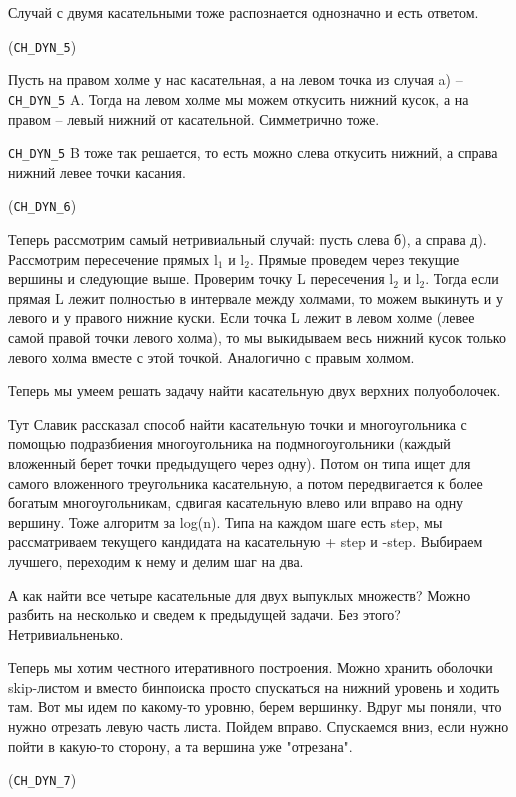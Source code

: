 \documentclass[11pt]{article}
\begin{document}
Случай с двумя касательными тоже распознается однозначно и есть
ответом.

(\verb~CH_DYN_5~)

Пусть на правом холме у нас касательная, а на левом точка из случая
a) -- \verb~CH_DYN_5~ A. Тогда на левом холме мы можем откусить нижний
кусок, а на правом -- левый нижний от касательной. Симметрично тоже.

\verb~CH_DYN_5~ B тоже так решается, то есть можно слева откусить нижний, а
справа нижний левее точки касания.

(\verb~CH_DYN_6~)

Теперь рассмотрим самый нетривиальный случай: пусть слева б), а
справа д). Рассмотрим пересечение прямых l$_{\text{1}}$ и l$_{\text{2}}$. Прямые проведем
через текущие вершины и следующие выше. Проверим точку L пересечения
l$_{\text{2}}$ и l$_{\text{2}}$. Тогда если прямая L лежит полностью в интервале между
холмами, то можем выкинуть и у левого и у правого нижние куски. Если
точка L лежит в левом холме (левее самой правой точки левого холма),
то мы выкидываем весь нижний кусок только левого холма вместе с этой
точкой. Аналогично с правым холмом.

Теперь мы умеем решать задачу найти касательную двух верхних
полуоболочек.

Тут Славик рассказал способ найти касательную точки и многоугольника
с помощью подразбиения многоугольника на подмногоугольники (каждый
вложенный берет точки предыдущего через одну). Потом он типа ищет
для самого вложенного треугольника касательную, а потом
передвигается к более богатым многоугольникам, сдвигая касательную
влево или вправо на одну вершину. Тоже алгоритм за log(n). Типа на
каждом шаге есть step, мы рассматриваем текущего кандидата на
касательную + step и -step. Выбираем лучшего, переходим к нему и
делим шаг на два.

А как найти все четыре касательные для двух выпуклых множеств?
Можно разбить на несколько и сведем к предыдущей задачи. Без этого?
Нетривиальненько.



Теперь мы хотим честного итеративного построения. Можно хранить
оболочки skip-листом и вместо бинпоиска просто спускаться на нижний
уровень и ходить там. Вот мы идем по какому-то уровню, берем
вершинку. Вдруг мы поняли, что нужно отрезать левую часть
листа. Пойдем вправо. Спускаемся вниз, если нужно пойти в какую-то
сторону, а та вершина уже "отрезана".

(\verb~CH_DYN_7~)
\end{document}
